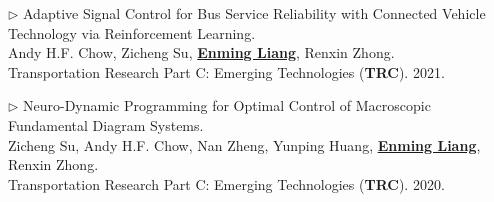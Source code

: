 \documentclass[letterpaper,11pt]{article}
\begin{document}
{    \item{  $\rhd$
      Adaptive Signal Control for Bus Service Reliability with Connected Vehicle Technology via Reinforcement Learning. \\
      Andy H.F. Chow, Zicheng Su, \underline{\textbf{Enming Liang}}, Renxin Zhong. \\
      Transportation Research Part C: Emerging Technologies (\textbf{TRC}). 2021.
    }
    \vspace{5pt}
    \item{$\rhd$
      Neuro-Dynamic Programming for Optimal Control of Macroscopic Fundamental Diagram Systems. \\
      Zicheng Su, Andy H.F. Chow, Nan Zheng, Yunping Huang, \underline{\textbf{Enming Liang}}, Renxin Zhong. \\
      Transportation Research Part C: Emerging Technologies (\textbf{TRC}). 2020.
    }
    \vspace{5pt}
  
  
  
  
}
\end{document}
